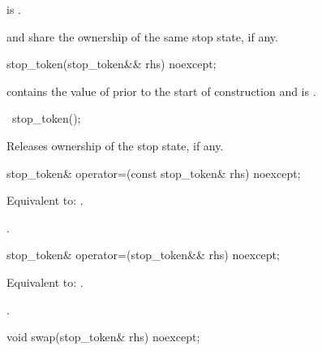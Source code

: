 \begin{itemdescr}
\pnum
\ensures
{} is .
\begin{note}
 and  share the ownership of the same stop state,
if any.
\end{note}
\end{itemdescr}

%
\begin{itemdecl}
stop_token(stop_token&& rhs) noexcept;
\end{itemdecl}
\begin{itemdescr}
\pnum
\ensures
{} contains the value of 
prior to the start of construction
and  is .
\end{itemdescr}

%
\begin{itemdecl}
~stop_token();
\end{itemdecl}

\begin{itemdescr}
\pnum
\effects
Releases ownership of the stop state, if any.
\end{itemdescr}

%
\begin{itemdecl}
stop_token& operator=(const stop_token& rhs) noexcept;
\end{itemdecl}

\begin{itemdescr}
\pnum
\effects
Equivalent to: .

\pnum
\returns
{}.
\end{itemdescr}

%
\begin{itemdecl}
stop_token& operator=(stop_token&& rhs) noexcept;
\end{itemdecl}

\begin{itemdescr}
\pnum
\effects
Equivalent to: .

\pnum
\returns
{}.
\end{itemdescr}

%
\begin{itemdecl}
void swap(stop_token& rhs) noexcept;
\end{itemdecl}

